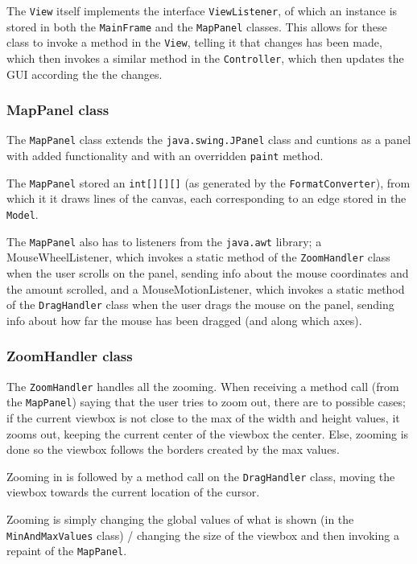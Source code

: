 \documentclass[a4paper,11pt]{article}
\begin{document}
The \texttt{View} itself implements the interface \texttt{ViewListener}, of which an instance is stored in both the \texttt{MainFrame} and the \texttt{MapPanel} classes. This allows for these class to invoke a method in the \texttt{View}, telling it that changes has been made, which then invokes a similar method in the \texttt{Controller}, which then updates the GUI according the the changes.

\subsubsection{MapPanel class} %
The \texttt{MapPanel} class extends the \texttt{java.swing.JPanel} class and cuntions as a panel with added functionality and with an overridden \texttt{paint} method.

The \texttt{MapPanel} stored an \texttt{int[][][]} (as generated by the \texttt{FormatConverter}), from which it it draws lines of the canvas, each corresponding to an edge stored in the \texttt{Model}.

The \texttt{MapPanel} also has to listeners from the \texttt{java.awt} library; a MouseWheelListener, which invokes a static method of the \texttt{ZoomHandler} class when the user scrolls on the panel, sending info about the mouse coordinates and the amount scrolled, and a MouseMotionListener, which invokes a static method of the \texttt{DragHandler} class when the user drags the mouse on the panel, sending info about how far the mouse has been dragged (and along which axes).

\subsubsection{ZoomHandler class} %
The \texttt{ZoomHandler} handles all the zooming. When receiving a method call (from the \texttt{MapPanel}) saying that the user tries to zoom out, there are to possible cases; if the current viewbox is not close to the max of the width and height values, it zooms out, keeping the current center of the viewbox the center. Else, zooming is done so  the viewbox follows the borders created by the max values.

Zooming in is followed by a method call on the \texttt{DragHandler} class, moving the viewbox towards the current location of the cursor.

Zooming is simply changing the global values of what is shown (in the \texttt{MinAndMaxValues} class) / changing the size of the viewbox and then invoking a repaint of the \texttt{MapPanel}.
\end{document}
